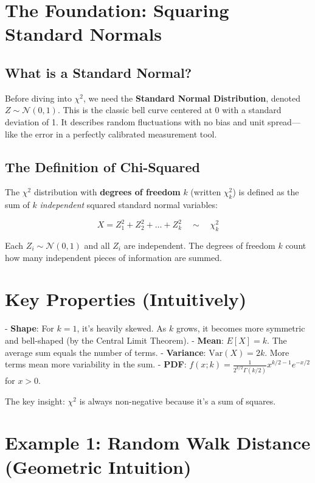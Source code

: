 \documentclass{article}
\begin{document}
\section{The Foundation: Squaring Standard Normals}

\subsection*{What is a Standard Normal?}

Before diving into $\chi^2$, we need the \textbf{Standard Normal Distribution}, denoted $Z \sim \mathcal{N}(0,1)$. This is the classic bell curve centered at 0 with a standard deviation of 1. It describes random fluctuations with no bias and unit spread—like the error in a perfectly calibrated measurement tool.

\subsection*{The Definition of Chi-Squared}

The $\chi^2$ distribution with \textbf{degrees of freedom} $k$ (written $\chi^2_k$) is defined as the sum of $k$ \textit{independent} squared standard normal variables:

\begin{equation}
    \boxed{X = Z_1^2 + Z_2^2 + \dots + Z_k^2 \quad \sim \quad \chi^2_k}
\end{equation}

Each $Z_i \sim \mathcal{N}(0,1)$ and all $Z_i$ are independent. The degrees of freedom $k$ count how many independent pieces of information are summed.

\section{Key Properties (Intuitively)}

- \textbf{Shape}: For $k=1$, it's heavily skewed. As $k$ grows, it becomes more symmetric and bell-shaped (by the Central Limit Theorem).
- \textbf{Mean}: $E[X] = k$. The average sum equals the number of terms.
- \textbf{Variance}: $\text{Var}(X) = 2k$. More terms mean more variability in the sum.
- \textbf{PDF}: $f(x; k) = \frac{1}{2^{k/2}\Gamma(k/2)} x^{k/2-1} e^{-x/2}$ for $x > 0$.

The key insight: $\chi^2$ is always non-negative because it's a sum of squares.

\section{Example 1: Random Walk Distance (Geometric Intuition)}
\end{document}
